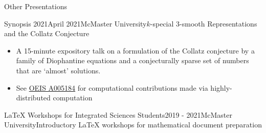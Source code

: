 \begin{rSection}{Other Presentations}

\begin{rSubsection}{Synopsis 2021}{April 2021}{McMaster University}{$k$-special $3$-smooth Representations and the Collatz Conjecture}
    \begin{itemize}
      \addtolength\itemsep{-0.5em}
      \item A 15-minute expository talk on a formulation of the Collatz conjecture by a family of Diophantine equations and a conjecturally sparse set of numbers that are `almost' solutions.
      \item See \href{https://oeis.org/A005184}{OEIS A005184} for computational contributions made via highly-distributed computation
    \end{itemize}
\end{rSubsection}
\smallskip

\begin{rSubsection}{LaTeX Workshops for Integrated Sciences Students}{2019 - 2021}{McMaster University}{Introductory LaTeX workshops for mathematical document preparation}
\end{rSubsection}
\smallskip







\end{rSection}
